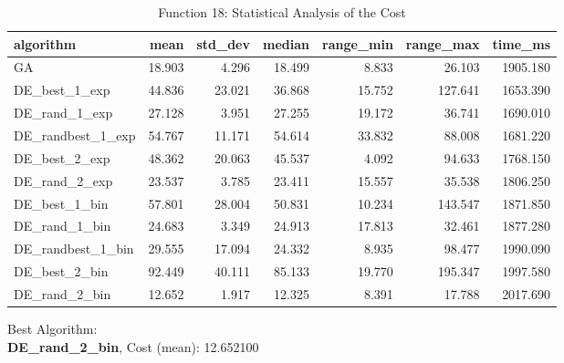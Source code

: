 \documentclass[12pt]{article}
\begin{document}
\begin{table}[H]
    \centering
    \footnotesize
\begin{tabular}{lrrrrrr}
\toprule
         algorithm &   mean &  std\_dev &  median &  range\_min &  range\_max &  time\_ms \\
\midrule
                GA & 18.903 &    4.296 &  18.499 &      8.833 &     26.103 & 1905.180 \\
     DE\_best\_1\_exp & 44.836 &   23.021 &  36.868 &     15.752 &    127.641 & 1653.390 \\
     DE\_rand\_1\_exp & 27.128 &    3.951 &  27.255 &     19.172 &     36.741 & 1690.010 \\
 DE\_randbest\_1\_exp & 54.767 &   11.171 &  54.614 &     33.832 &     88.008 & 1681.220 \\
     DE\_best\_2\_exp & 48.362 &   20.063 &  45.537 &      4.092 &     94.633 & 1768.150 \\
     DE\_rand\_2\_exp & 23.537 &    3.785 &  23.411 &     15.557 &     35.538 & 1806.250 \\
     DE\_best\_1\_bin & 57.801 &   28.004 &  50.831 &     10.234 &    143.547 & 1871.850 \\
     DE\_rand\_1\_bin & 24.683 &    3.349 &  24.913 &     17.813 &     32.461 & 1877.280 \\
 DE\_randbest\_1\_bin & 29.555 &   17.094 &  24.332 &      8.935 &     98.477 & 1990.090 \\
     DE\_best\_2\_bin & 92.449 &   40.111 &  85.133 &     19.770 &    195.347 & 1997.580 \\
     DE\_rand\_2\_bin & 12.652 &    1.917 &  12.325 &      8.391 &     17.788 & 2017.690 \\
\bottomrule
\end{tabular}

\caption{Function 18: Statistical Analysis of the Cost} 
    \end{table}
Best Algorithm: \\
\textbf{DE\_rand\_2\_bin}, Cost (mean): 12.652100\\
\end{document}
